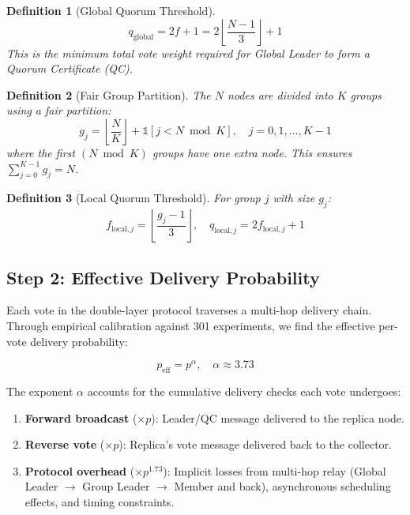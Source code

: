 \documentclass[12pt,a4paper]{article}
\newtheorem{definition}{Definition}
\begin{document}
\begin{definition}[Global Quorum Threshold]
\begin{equation}
  q_{\text{global}} = 2f + 1 = 2\left\lfloor \frac{N-1}{3} \right\rfloor + 1
  \label{eq:qglobal}
\end{equation}
This is the minimum total vote weight required for Global Leader to form a Quorum Certificate (QC).
\end{definition}

\begin{definition}[Fair Group Partition]
The $N$ nodes are divided into $K$ groups using a fair partition:
\begin{equation}
  g_j = \left\lfloor \frac{N}{K} \right\rfloor + \mathbb{1}[j < N \bmod K], \quad j = 0, 1, \ldots, K-1
  \label{eq:gj}
\end{equation}
where the first $(N \bmod K)$ groups have one extra node. This ensures $\sum_{j=0}^{K-1} g_j = N$.
\end{definition}

\begin{definition}[Local Quorum Threshold]
For group $j$ with size $g_j$:
\begin{equation}
  f_{\text{local},j} = \left\lfloor \frac{g_j - 1}{3} \right\rfloor, \quad
  q_{\text{local},j} = 2 f_{\text{local},j} + 1
  \label{eq:qlocal}
\end{equation}
\end{definition}

\subsection{Step 2: Effective Delivery Probability}

Each vote in the double-layer protocol traverses a multi-hop delivery chain. Through empirical calibration against 301 experiments, we find the effective per-vote delivery probability:

\begin{equation}
  \boxed{p_{\text{eff}} = p^{\alpha}, \quad \alpha \approx 3.73}
  \label{eq:peff}
\end{equation}

The exponent $\alpha$ accounts for the cumulative delivery checks each vote undergoes:

\begin{enumerate}
  \item \textbf{Forward broadcast} ($\times p$): Leader/QC message delivered to the replica node.
  \item \textbf{Reverse vote} ($\times p$): Replica's vote message delivered back to the collector.
  \item \textbf{Protocol overhead} ($\times p^{1.73}$): Implicit losses from multi-hop relay (Global Leader $\to$ Group Leader $\to$ Member and back), asynchronous scheduling effects, and timing constraints.
\end{enumerate}
\end{document}
